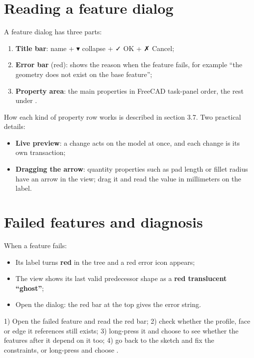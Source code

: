 \section{Reading a feature dialog}

A feature dialog has three parts:

\begin{enumerate}
  \item \textbf{Title bar}: name + ▾ collapse + ✓ OK + ✗ Cancel;
  \item \textbf{Error bar} (red): shows the reason when the feature fails, for example ``the geometry does not exist on
        the base feature'';
  \item \textbf{Property area}: the main properties in FreeCAD task-panel order, the rest under .
\end{enumerate}

How each kind of property row works is described in section 3.7. Two practical details:

\begin{itemize}
  \item \textbf{Live preview}: a change acts on the model at once, and each change is its own transaction;
  \item \textbf{Dragging the arrow}: quantity properties such as pad length or fillet radius have an arrow in the view;
        drag it and read the value in millimeters on the label.
\end{itemize}

\section{Failed features and diagnosis}

When a feature fails:

\begin{itemize}
  \item Its label turns \textbf{red} in the tree and a red error icon appears;
  \item The view shows its last valid predecessor shape as a \textbf{red translucent ``ghost''};
  \item Open the dialog: the red bar at the top gives the error string.
\end{itemize}

\begin{practice}
1) Open the failed feature and read the red bar; 2) check whether the profile, face or edge it references still exists; 3) long-press it and choose  to see whether the features after it depend on it too;
4) go back to the sketch and fix the constraints, or long-press and choose .
\end{practice}

